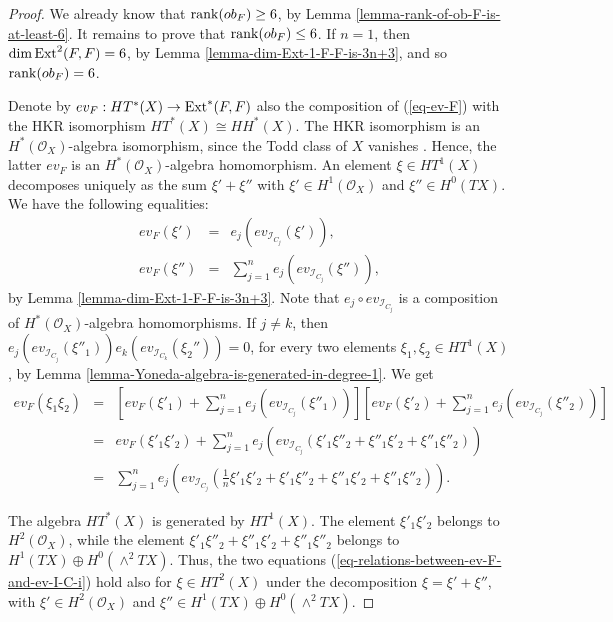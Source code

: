 \documentclass[12pt]{amsart}
\numberwithin{equation}{subsection}
\theoremstyle{plain}
\theoremstyle{definition}
\newcommand{\StructureSheaf}[1]{{\mathcal O}_{#1}}
\newcommand{\rank}{{\rm rank}}
\newcommand{\Ext}{{\rm Ext}}
\newcommand{\Ideal}[1]{{\mathcal I}_{#1}}
\begin{document}
\begin{proof}
We already know that $\rank(ob_F)\geq 6$, by Lemma \ref{lemma-rank-of-ob-F-is-at-least-6}.
It remains to prove that $\rank(ob_F)\leq 6$.
If $n=1$, then $\dim\Ext^2(F,F)=6$, by Lemma \ref{lemma-dim-Ext-1-F-F-is-3n+3}, and  so $\rank(ob_F)= 6$.

Denote by $ev_F:HT^*(X)\rightarrow \Ext^*(F,F)$ also the composition of (\ref{eq-ev-F})
with the HKR isomorphism $HT^*(X)\cong HH^*(X)$. The HKR isomorphism is an $H^*(\StructureSheaf{X})$-algebra isomorphism,  since the Todd class of $X$ vanishes \cite{calaque-et-al}. Hence, the latter $ev_F$ is an $H^*(\StructureSheaf{X})$-algebra homomorphism.
An element $\xi\in HT^1(X)$ decomposes uniquely as the sum $\xi'+\xi''$ with $\xi'\in H^1(\StructureSheaf{X})$ and $\xi''\in H^0(TX).$
We have the following equalities:
\begin{eqnarray}
\label{eq-relations-between-ev-F-and-ev-I-C-i}
ev_F(\xi') &=& e_j(ev_{\Ideal{C_j}}(\xi')),
\\
\nonumber
ev_F(\xi'')&=&\sum_{j=1}^n e_j(ev_{\Ideal{C_j}}(\xi'')),
\end{eqnarray}
by Lemma \ref{lemma-dim-Ext-1-F-F-is-3n+3}.
Note that  $e_j\circ ev_{\Ideal{C_j}}$ is a  composition of $H^*(\StructureSheaf{X})$-algebra homomorphisms.
If $j\neq k$, then $e_j(ev_{\Ideal{C_j}}(\xi''_1))e_k(ev_{\Ideal{C_k}}(\xi_2''))=0$, for every two elements $\xi_1, \xi_2\in HT^1(X)$, by Lemma \ref{lemma-Yoneda-algebra-is-generated-in-degree-1}. We get
\begin{eqnarray*}
ev_F(\xi_1\xi_2) &=&
\left[ev_F(\xi'_1)+\sum_{j=1}^n  e_j(ev_{\Ideal{C_j}}(\xi''_1))\right]
\left[ev_F(\xi'_2)+\sum_{j=1}^n  e_j(ev_{\Ideal{C_j}}(\xi''_2))\right]
\\ 
&=&
ev_F(\xi'_1\xi'_2)+
\sum_{j=1}^n e_j(ev_{\Ideal{C_j}}(\xi'_1\xi''_2+\xi''_1\xi'_2+\xi''_1\xi''_2))
\\ 
&=& \sum_{j=1}^n e_j\left(ev_{\Ideal{C_j}}\left(\frac{1}{n}\xi'_1\xi'_2+\xi'_1\xi''_2+\xi''_1\xi'_2+\xi''_1\xi''_2\right)\right).
\end{eqnarray*}

The algebra $HT^*(X)$ is generated by $HT^1(X)$. The element $\xi'_1\xi'_2$ belongs to $H^2(\StructureSheaf{X})$,
while the element $\xi'_1\xi''_2+\xi''_1\xi'_2+\xi''_1\xi''_2$ belongs to $H^1(TX)\oplus H^0(\wedge^2TX)$. 
Thus, the two equations (\ref{eq-relations-between-ev-F-and-ev-I-C-i}) hold also for $\xi\in HT^2(X)$ under the decomposition $\xi=\xi'+\xi''$, with $\xi'\in H^2(\StructureSheaf{X})$ and $\xi''\in H^1(TX)\oplus H^0(\wedge^2TX)$. 


\end{proof}
\end{document}
